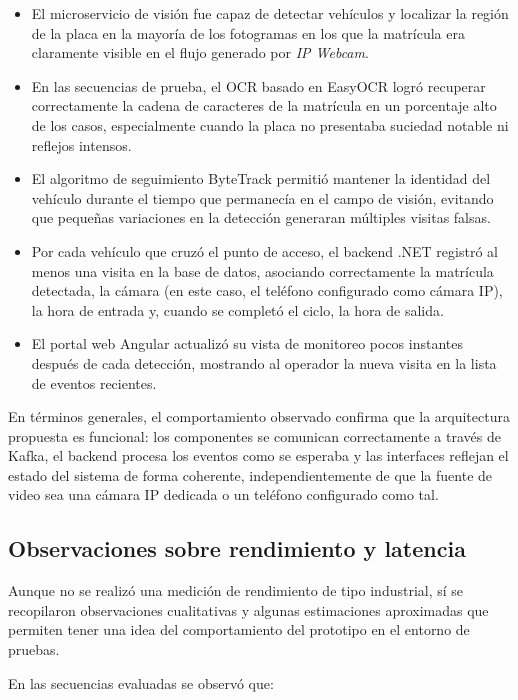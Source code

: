\begin{itemize}
    \item El microservicio de visión fue capaz de detectar vehículos y localizar la región de la placa en la mayoría de los fotogramas en los que la matrícula era claramente visible en el flujo generado por \textit{IP Webcam}.
    \item En las secuencias de prueba, el OCR basado en EasyOCR logró recuperar correctamente la cadena de caracteres de la matrícula en un porcentaje alto de los casos, especialmente cuando la placa no presentaba suciedad notable ni reflejos intensos.
    \item El algoritmo de seguimiento ByteTrack permitió mantener la identidad del vehículo durante el tiempo que permanecía en el campo de visión, evitando que pequeñas variaciones en la detección generaran múltiples visitas falsas.
    \item Por cada vehículo que cruzó el punto de acceso, el backend .NET registró al menos una visita en la base de datos, asociando correctamente la matrícula detectada, la cámara (en este caso, el teléfono configurado como cámara IP), la hora de entrada y, cuando se completó el ciclo, la hora de salida.
    \item El portal web Angular actualizó su vista de monitoreo pocos instantes después de cada detección, mostrando al operador la nueva visita en la lista de eventos recientes.
\end{itemize}

En términos generales, el comportamiento observado confirma que la arquitectura propuesta es funcional: los componentes se comunican correctamente a través de Kafka, el backend procesa los eventos como se esperaba y las interfaces reflejan el estado del sistema de forma coherente, independientemente de que la fuente de video sea una cámara IP dedicada o un teléfono configurado como tal.

\subsection{Observaciones sobre rendimiento y latencia}

Aunque no se realizó una medición de rendimiento de tipo industrial, sí se recopilaron observaciones cualitativas y algunas estimaciones aproximadas que permiten tener una idea del comportamiento del prototipo en el entorno de pruebas.

En las secuencias evaluadas se observó que:

